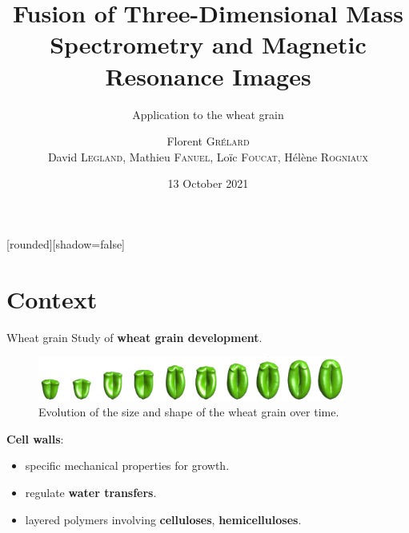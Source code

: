\documentclass[10pt]{beamer}
\title{Fusion of Three-Dimensional Mass Spectrometry and Magnetic Resonance Images}
\subtitle{\normalsize Application to the wheat grain}
\institute{OurCon 2021}
\author{{Florent \textsc{Grélard}\\
    David \textsc{Legland}, Mathieu \textsc{Fanuel}, Loïc \textsc{Foucat}, Hélène \textsc{Rogniaux}}}
\begin{document}
[rounded][shadow=false]

\date{\vspace{0.2cm}13 October 2021} %



\makeatletter
\AtBeginPart{%
  \beamer@tocsectionnumber=0\relax
  \setcounter{section}{0}
}
\makeatother

\begin{frame}[plain]
  \titlepage
\end{frame}

\section{Context}
\begin{frame}{Wheat grain}
  Study of \textbf{wheat grain development}.

  \begin{figure}[ht]
    \centering
    \includegraphics[width=0.9\textwidth]{fig/stages}
    \caption{Evolution of the size and shape of the wheat grain over time.}
  \end{figure}

  
  \textbf{Cell walls}:
  \begin{itemize}
  \item specific mechanical properties for growth.
  \item regulate \textbf{water transfers}.
  \item layered polymers involving \textbf{celluloses}, \textbf{hemicelluloses}.
  \end{itemize}

  

\end{frame}
\end{document}
